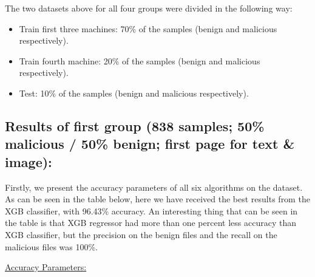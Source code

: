 \documentclass{article}
\begin{document}
\indent The two datasets above for all four groups were divided in the following way:
\renewcommand{\labelitemi}{$\textendash$}
\begin{itemize}
    \item Train first three machines: 70\% of the samples (benign and malicious respectively).
    \item Train fourth machine: 20\% of the samples (benign and malicious respectively).
	\item Test: 10\% of the samples (benign and malicious respectively).
\end{itemize}

\subsection{Results of first group (838 samples; 50\% malicious / 50\% benign; first page for text \& image):}
\indent Firstly, we present the accuracy parameters of all six algorithms on the dataset. As can be seen in the table below, here we have received the best results from the XGB classifier, with 96.43\% accuracy.  An interesting thing that can be seen in the table is that XGB regressor had more than one percent less accuracy than XGB classifier, but the precision on the benign files and the recall on the malicious files was 100\%.

\noindent\underline{Accuracy Parameters:}
\end{document}
